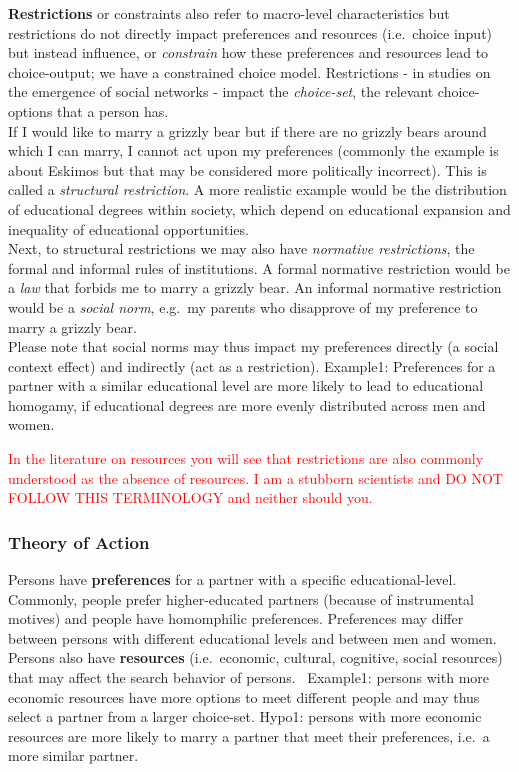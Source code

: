 \documentclass[
]{book}
\begin{document}
\textbf{Restrictions} or constraints also refer to macro-level characteristics but restrictions do not directly impact preferences and resources (i.e.~choice input) but instead influence, or \emph{constrain} how these preferences and resources lead to choice-output; we have a constrained choice model. Restrictions - in studies on the emergence of social networks - impact the \emph{choice-set}, the relevant choice-options that a person has.\\
If I would like to marry a grizzly bear but if there are no grizzly bears around which I can marry, I cannot act upon my preferences (commonly the example is about Eskimos but that may be considered more politically incorrect). This is called a \emph{structural restriction}. A more realistic example would be the distribution of educational degrees within society, which depend on educational expansion and inequality of educational opportunities.\\
Next, to structural restrictions we may also have \emph{normative restrictions}, the formal and informal rules of institutions. A formal normative restriction would be a \emph{law} that forbids me to marry a grizzly bear. An informal normative restriction would be a \emph{social norm}, e.g.~my parents who disapprove of my preference to marry a grizzly bear.\\
Please note that social norms may thus impact my preferences directly (a social context effect) and indirectly (act as a restriction).
Example1: Preferences for a partner with a similar educational level are more likely to lead to educational homogamy, if educational degrees are more evenly distributed across men and women.

\textcolor{red}{In the literature on resources you will see that restrictions are also commonly understood as the absence of resources. I am a stubborn scientists and DO NOT FOLLOW THIS TERMINOLOGY and neither should you.}

\hypertarget{theory-of-action}{%
\subsubsection*{Theory of Action}\label{theory-of-action}}

Persons have \textbf{preferences} for a partner with a specific educational-level. Commonly, people prefer higher-educated partners (because of instrumental motives) and people have homomphilic preferences. Preferences may differ between persons with different educational levels and between men and women.\\
Persons also have \textbf{resources} (i.e.~economic, cultural, cognitive, social resources) that may affect the search behavior of persons.~
Example1: persons with more economic resources have more options to meet different people and may thus select a partner from a larger choice-set.
Hypo1: persons with more economic resources are more likely to marry a partner that meet their preferences, i.e.~a more similar partner.
\end{document}

